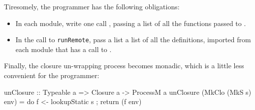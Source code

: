 \documentclass[preprint]{sigplanconf}
\begin{document}
Tiresomely, the programmer has the following obligations:
\begin{itemize}
\item In each module, write one call ,
passing a list of all the functions passed to .
\item In the call to \texttt{runRemote}, pass a list
a list of all the  definitions, imported from
each module that has a call to .
\end{itemize}

Finally, the closure un-wrapping process becomes monadic, which is
a little less convenient for the programmer:
\begin{code}
  unClosure :: Typeable a => Closure a -> ProcessM a
  unClosure (MkClo (MkS s) env)
    = do { f <- lookupStatic s
         ; return (f env) }
\end{code}
\end{document}
